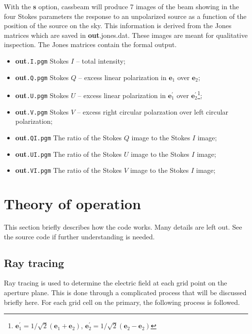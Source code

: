 \documentclass{article}
\begin{document}
With the {\bf s} option, cassbeam will produce 7 images of the beam showing
in the four Stokes parameters the response to an unpolarized source as
a function of the position of the source on the sky.  This information
is derived from the Jones matrices which are saved in
{\bf out}{.jones.dat}.  These images are meant for qualitative inspection.
The Jones matrices contain the formal output.
\begin{itemize}
\item {\bf out}{\tt .I.pgm} Stokes $I$ -- total intensity; 
\item {\bf out}{\tt .Q.pgm} Stokes $Q$ -- excess linear polarization in
$\mathbf{e}_1$ over $\mathbf{e}_2$;
\item {\bf out}{\tt .U.pgm} Stokes $U$ -- excess linear polarization in
$\mathbf{e}_1^\prime$ over $\mathbf{e}_2^\prime$\footnote{
$\mathbf{e}_1^\prime = 1/\sqrt{2}(\mathbf{e}_1 + \mathbf{e}_2)$,
$\mathbf{e}_2^\prime = 1/\sqrt{2}(\mathbf{e}_2 - \mathbf{e}_2)$};
\item {\bf out}{\tt .V.pgm} Stokes $V$ -- excess right circular polarzation
over left circular polarization;
\item {\bf out}{\tt .QI.pgm} The ratio of the Stokes $Q$ image to the 
Stokes $I$ image;
\item {\bf out}{\tt .UI.pgm} The ratio of the Stokes $U$ image to the 
Stokes $I$ image; 
\item {\bf out}{\tt .VI.pgm} The ratio of the Stokes $V$ image to the 
Stokes $I$ image; 
\end{itemize}

\section{Theory of operation}

This section briefly describes how the code works.  Many details are left out.
See the source code if further understanding is needed.

\subsection{Ray tracing} \label{sec:trace}

Ray tracing is used to determine the electric field at each grid point on the
aperture plane.  This is done through a complicated process that will be 
discussed briefly here.  For each grid cell on the primary, the following 
process is followed.
\end{document}
